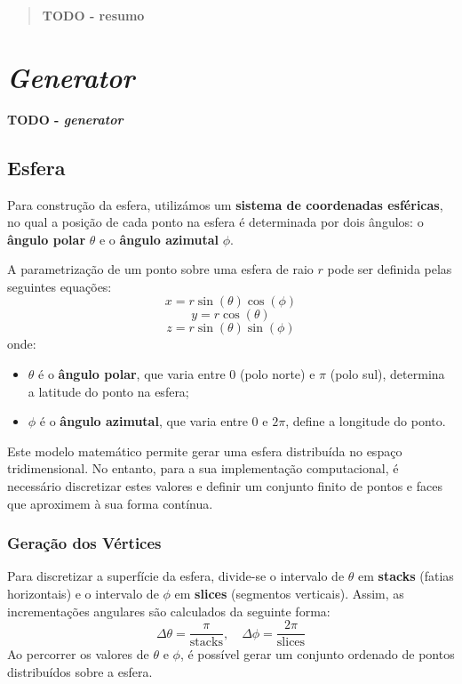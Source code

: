 \documentclass[12pt, a4paper]{article}
\begin{document}
\pagebreak

\begin{abstract}
    \textbf{\color{red} TODO - resumo}
\end{abstract}

\section{\emph{Generator}}

\textbf{\color{red} TODO - \emph{generator}}

\subsection{Esfera}

Para construção da esfera, utilizámos um \textbf{sistema de coordenadas esféricas}, no qual a posição de cada ponto na esfera é
determinada por dois ângulos: o \textbf{ângulo polar} \( \theta \) e o \textbf{ângulo azimutal} \( \phi \).  

A parametrização de um ponto sobre uma esfera de raio \( r \) pode ser definida pelas seguintes equações:  
\[
x = r \sin(\theta) \cos(\phi)
\]
\[
y = r \cos(\theta)
\]
\[
z = r \sin(\theta) \sin(\phi)
\]
onde:
\begin{itemize}
\item \( \theta \) é o \textbf{ângulo polar}, que varia entre \( 0 \) (polo norte) e \( \pi \) (polo sul),
determina a latitude do ponto na esfera;  
\item \( \phi \) é o \textbf{ângulo azimutal}, que varia entre \( 0 \) e \( 2\pi \), define a longitude do
ponto.
\end{itemize}

Este modelo matemático permite gerar uma esfera distribuída no espaço tridimensional.
No entanto, para a sua implementação computacional, é necessário discretizar estes valores e definir um
conjunto finito de pontos e faces que aproximem à sua forma contínua.  

\subsubsection{Geração dos Vértices} 
Para discretizar a superfície da esfera, divide-se o intervalo de \( \theta \) em \textbf{stacks}
(fatias horizontais) e o intervalo de \( \phi \) em \textbf{slices} (segmentos verticais). Assim, as
incrementações angulares são calculados da seguinte forma:
\[
\Delta\theta = \frac{\pi}{\text{stacks}}, \quad \Delta\phi = \frac{2\pi}{\text{slices}}
\]
Ao percorrer os valores de \( \theta \) e \( \phi \), é possível gerar um conjunto ordenado de pontos
distribuídos sobre a esfera.  
\end{document}

